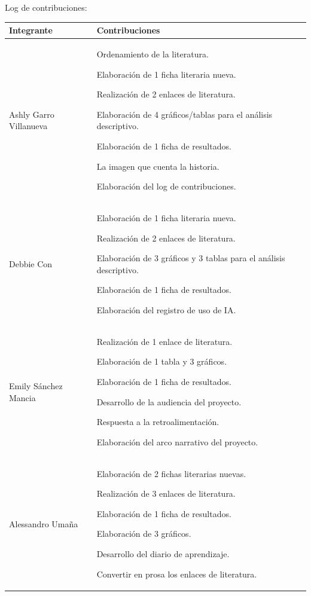 \documentclass[12pt]{article}
\begin{document}
Log de contribuciones: \begin{table}[H]
\centering
\begin{tabular}{|p{3cm}|p{8cm}|}
\hline
\textbf{Integrante} & \textbf{Contribuciones} \\ \hline

Ashly Garro Villanueva &
    Ordenamiento de la literatura. \par
    Elaboración de 1 ficha literaria nueva.\par
    Realización de 2 enlaces de literatura.\par
    Elaboración de 4 gráficos/tablas para el análisis descriptivo. \par
    Elaboración de 1 ficha de resultados. \par
    La imagen que cuenta la historia. \par
    Elaboración del log de contribuciones. \par
\\ \hline

Debbie Con &
    Elaboración de 1 ficha literaria nueva. \par
    Realización de 2 enlaces de literatura. \par
    Elaboración de 3 gráficos y 3 tablas para el análisis descriptivo. \par
    Elaboración de 1 ficha de resultados. \par
    Elaboración del registro de uso de IA. \par
\\ \hline

Emily Sánchez Mancia &
    Realización de 1 enlace de literatura. \par
    Elaboración de 1 tabla y 3 gráficos. \par
    Elaboración de 1 ficha de resultados. \par
    Desarrollo de la audiencia del proyecto. \par
    Respuesta a la retroalimentación. \par
    Elaboración del arco narrativo del proyecto. \par
\\ \hline

Alessandro Umaña &
    Elaboración de 2 fichas literarias nuevas. \par
    Realización de 3 enlaces de literatura. \par
    Elaboración de 1 ficha de resultados. \par
    Elaboración de 3 gráficos. \par
    Desarrollo del diario de aprendizaje. \par
    Convertir en prosa los enlaces de literatura. \par
\\ \hline

\end{tabular}
\end{table}
\end{document}
